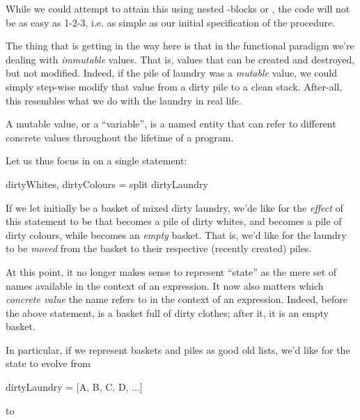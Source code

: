While we could attempt to attain this using nested -blocks or
, the code will not be as easy as 1-2-3, i.e.  as
simple as our initial specification of the procedure.

The thing that is getting in the way here is that in the functional paradigm
we're dealing with \emph{immutable} values. That is, values that can be created
and destroyed, but not modified. Indeed, if the pile of laundry was a
\emph{mutable} value, we could simply step-wise modify that value from a dirty
pile to a clean stack. After-all, this resembles what we do with the laundry in
real life.

\begin{definition}

A mutable value, or a ``variable'', is a named entity that can refer to
different concrete values throughout the lifetime of a program.

\end{definition}

Let us thus focus in on a single statement:

\begin{code}
dirtyWhites, dirtyColours = split dirtyLaundry
\end{code}

If we let  initially be a basket of mixed dirty laundry,
we'de like for the \emph{effect} of this statement to be that 
becomes a pile of dirty whites, and  becomes a pile of dirty
colours, while  becomes an \emph{empty} basket. That is, we'd
like for the laundry to be \emph{moved} from the basket to their respective
(recently created) piles.

At this point, it no longer makes sense to represent ``state'' as the mere set
of names available in the context of an expression. It now also matters which
\emph{concrete value} the name refers to in the context of an expression.
Indeed, before the above statement,  is a basket full of
dirty clothes; after it, it is an empty basket.

In particular, if we represent baskets and piles as good old lists, we'd like
for the state to evolve from

\begin{code}
{ dirtyLaundry = [A, B, C, D, ...] }
\end{code}

to

